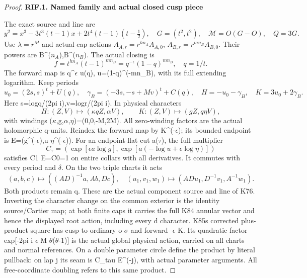 \begin{proof}
\par

\medskip\noindent\textbf{RIF.1. Named family and actual closed cusp piece}

\par\nobreak

The exact source and line are
\[
y^2=x^3-3t^3(t-1)x+2t^4(t-1)(t-\tfrac12),\quad
G=(t^2,t^2),\quad\mathcal M=O(G-O),\quad Q=3G.
\]
Use \(\lambda=r^M\) and actual cap actions
\(A_{A,r}=r^{hn_A}A_{A,0}\), \(A_{B,r}=r^{mn_B}A_{B,0}\).
Their powers are B\^{}(\(n_A\)),B\^{}(\(n_B\)). The actual closing is
\[
f=t^{hn_A}(t-1)^{mn_B}=q^{-\epsilon}(1-q)^{mn_B},\quad q=1/t.
\tag{RIF.2}
\]
The forward map is q\^{}\(\epsilon\) u(q), u=(1-q)\^{}(-mn\_B), with its full
extending logarithm. Keep periods
\[
u_0=(2s,s)^t+U(q),\quad\gamma_B=(-3s,-s+Mv)^t+C(q),
\quad H=-u_0-\gamma_B,\quad K=3u_0+2\gamma_B.
\]
Here s=logq/(2pi i),v=logr/(2pi i). In physical characters
\[
H:(Z,V)\mapsto(\kappa qZ,\alpha V),\qquad
K:(Z,V)\mapsto(gZ,q\eta V),
\tag{RIF.3}
\]
with windings (\(\kappa\),g,\(\alpha\),\(\eta\))=(0,0,-M,2M). All zero-winding
factors are the actual holomorphic q-units. Reindex the forward map
by K\^{}(-\(\epsilon\)); its bounded endpoint is E=(g\^{}(-\(\epsilon\)),u \(\eta\)\^{}(-\(\epsilon\))).
For an endpoint-flat cut a(\(\tau\)), the full multiplier
\[
C_\tau=(\exp[\epsilon a\log g],\exp[a(-\log u+\epsilon\log\eta)])
\tag{RIF.4}
\]
satisfies C1 E=C0=1 on entire collars with all derivatives. It commutes
with every period and \(\delta\). On the two triple charts it acts
\[
(a,b,c)\mapsto((AD)^{-1}a,Ab,Dc),\quad
(u_1,v_1,w_1)\mapsto(ADu_1,D^{-1}v_1,A^{-1}w_1).
\tag{RIF.5}
\]
Both products remain q. These are the actual component source and
line of K76. Inverting the character change on the common exterior
is the identity source/Cartier map; at both finite caps it carries
the full K84 annular vector and hence the displayed root action,
including every d character. K85\textquotesingle s corrected plus-product square
has cusp-to-ordinary o-\(\sigma\) and forward -\(\epsilon\) K. Its quadratic
factor exp{[}-2pi i \(\epsilon\) M \(\theta\)(\(\theta\)-1){]} is the actual global
physical action, carried on all charts and normal references. On a
double parameter circle define the product by literal pullback:
on lap j its seam is C\_tau E\^{}(-j), with actual parameter arguments.
All free-coordinate doubling refers to this same product.

\par


\end{proof}
